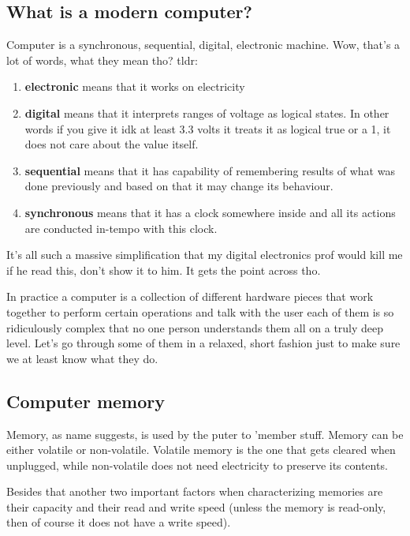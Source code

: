 \documentclass[../ops.tex]{subfiles}
\begin{document}
        \subsection{What is a modern computer?}
        Computer is a synchronous, sequential, digital, electronic machine. Wow,
        that's a lot of words, what they mean tho? tldr:
        \begin{enumerate}
                \item {\bf electronic} means that it works on electricity
                \item {\bf digital} means that it interprets ranges of voltage
                        as logical states. In other words if you give it idk at
                        least 3.3 volts it treats it as logical true or a 1, it
                        does not care about the value itself.
                \item {\bf sequential} means that it has capability of
                        remembering results of what was done previously and
                        based on that it may change its behaviour.
                \item {\bf synchronous} means that it has a clock somewhere
                        inside and all its actions are conducted in-tempo with
                        this clock.
        \end{enumerate}
        It's all such a massive simplification that my digital electronics prof
        would kill me if he read this, don't show it to him. It gets the point
        across tho.

        In practice a computer is a collection of different hardware pieces that
        work together to perform certain operations and talk with the user each
        of them is so ridiculously complex that no one person understands them
        all on a truly deep level. Let's go through some of them in a relaxed,
        short fashion just to make sure we at least know what they do.

        \subsection{Computer memory}
        Memory, as name suggests, is used by the puter to 'member stuff. Memory
        can be either volatile or non-volatile. Volatile memory is the one that
        gets cleared when unplugged, while non-volatile does not need
        electricity to preserve its contents.

        Besides that another two important factors when characterizing memories
        are their capacity and their read and write speed (unless the memory
        is read-only, then of course it does not have a write speed).
\end{document}
